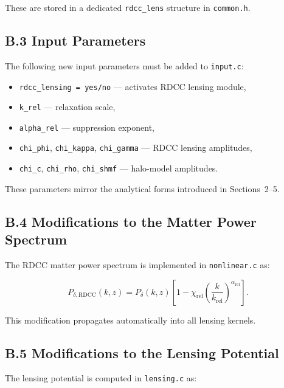 \documentclass[11pt,a4paper]{article}
\begin{document}
These are stored in a dedicated \texttt{rdcc\_lens} structure in \texttt{common.h}.

\subsection*{B.3 Input Parameters}

The following new input parameters must be added to \texttt{input.c}:

\begin{itemize}
\item \texttt{rdcc\_lensing = yes/no} — activates RDCC lensing module,
\item \texttt{k\_rel} — relaxation scale,
\item \texttt{alpha\_rel} — suppression exponent,
\item \texttt{chi\_phi}, \texttt{chi\_kappa}, \texttt{chi\_gamma} — RDCC lensing amplitudes,
\item \texttt{chi\_c}, \texttt{chi\_rho}, \texttt{chi\_shmf} — halo-model amplitudes.
\end{itemize}

These parameters mirror the analytical forms introduced in Sections~2–5.

\subsection*{B.4 Modifications to the Matter Power Spectrum}

The RDCC matter power spectrum is implemented in \texttt{nonlinear.c} as:

\begin{equation}
P_{\delta,\mathrm{RDCC}}(k,z)
=
P_{\delta}(k,z)
\left[
1
-
\chi_{\mathrm{rel}}
\left(
\frac{k}{k_{\mathrm{rel}}}
\right)^{\alpha_{\mathrm{rel}}}
\right].
\end{equation}

This modification propagates automatically into all lensing kernels.

\subsection*{B.5 Modifications to the Lensing Potential}

The lensing potential is computed in \texttt{lensing.c} as:
\end{document}

